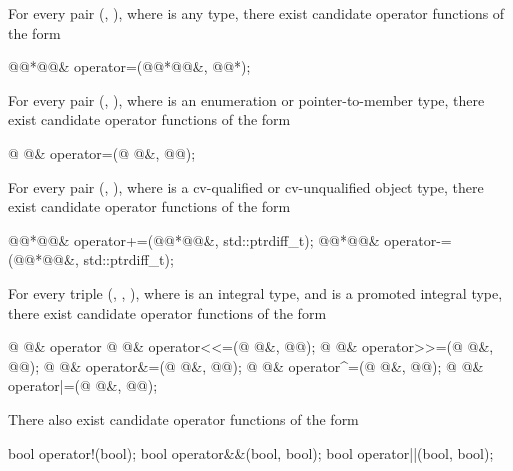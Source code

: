 \pnum
For every pair (, ),
where  is any type,
there exist candidate operator functions of the form
\begin{codeblock}
@@*@@&   operator=(@@*@@&, @@*);
\end{codeblock}

\pnum
For every pair
(,
),
where
is an enumeration or pointer-to-member type,
there exist candidate operator functions of the form
\begin{codeblock}
@ @&   operator=(@ @&, @@);
\end{codeblock}

\pnum
For every pair
(,
),
where
is a cv-qualified or cv-unqualified object type,
there exist candidate operator functions of the form
\begin{codeblock}
@@*@@&   operator+=(@@*@@&, std::ptrdiff_t);
@@*@@&   operator-=(@@*@@&, std::ptrdiff_t);
\end{codeblock}

\pnum
For every triple
(,
,
),
where
is an integral type, and
is a promoted integral type,
there exist candidate operator functions of the form
\begin{codeblock}
@ @&   operator%
@ @&   operator<<=(@ @&, @@);
@ @&   operator>>=(@ @&, @@);
@ @&   operator&=(@ @&, @@);
@ @&   operator^=(@ @&, @@);
@ @&   operator|=(@ @&, @@);
\end{codeblock}

\pnum
There also exist candidate operator functions of the form
\begin{codeblock}
bool    operator!(bool);
bool    operator&&(bool, bool);
bool    operator||(bool, bool);
\end{codeblock}

